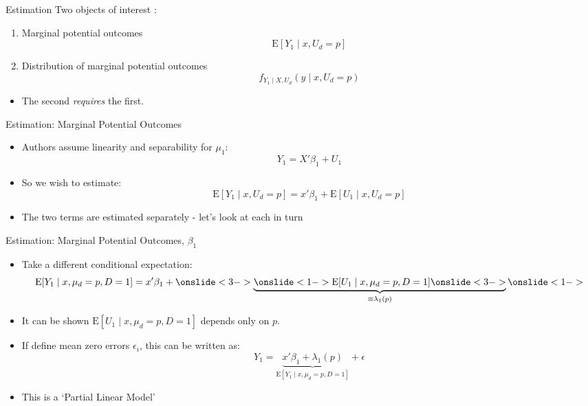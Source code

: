 \documentclass{beamer}
\begin{document}
\begin{frame}{Estimation}
  Two objects of interest :
\begin{enumerate}
\item Marginal potential outcomes
\begin{equation*}
  \mathrm{E}[Y_1\mid x,U_d=p]
\end{equation*}
\item Distribution of marginal potential outcomes
  \begin{equation*}
    f_{Y_1\mid X,U_d}(y\mid x,U_d=p)
  \end{equation*}
\end{enumerate} \pause
\begin{itemize}
\item The second \textit{requires} the first.
\end{itemize}

\end{frame}


\begin{frame}{Estimation: Marginal Potential Outcomes  }
  \begin{itemize}
  \item Authors assume linearity and separability for $\mu_1$:
    \begin{equation*}
      Y_1  = X'\beta_1 +  U_1
    \end{equation*} \pause
\item So we wish to estimate:
    \begin{equation*}
      \mathrm{E}[Y_1\mid x,U_d=p]  = x'\beta_1 +  \mathrm{E}[U_1\mid x,U_d=p]
    \end{equation*} \pause
\item The two terms are estimated separately - let's look at each in turn
  \end{itemize}
\end{frame}

\begin{frame}{Estimation:  Marginal Potential Outcomes, $\beta_1$}
  \begin{itemize}
\item Take a different conditional expectation:
 \belowdisplayskip=0pt
\begin{equation*}
  \mathrm{E}[Y_1\mid x, \mu_d=p,D=1] = x'\beta_1 +  \onslide<3->\underbrace{\onslide<1->\mathrm{E}[U_1\mid x,\mu_d=p,
  D=1   ] \onslide<3->}_{\equiv \lambda_1(p) }  \onslide<1->
\end{equation*} \pause
\item It can be shown $\mathrm{E}[U_1\mid x,\mu_d=p,
  D=1   ]$ depends only on $p$. 
\item If define mean zero errors $\epsilon_i$, this can be written as:
 \begin{equation*}
    Y_1 = \underbrace{x'\beta_1 +  \lambda_1(p)}_{\mathrm{E}[Y_1\mid x, \mu_d=p,D=1]} + \epsilon
  \end{equation*}
\item This is a `Partial Linear Model'
\end{itemize}
\end{frame}
\end{document}

